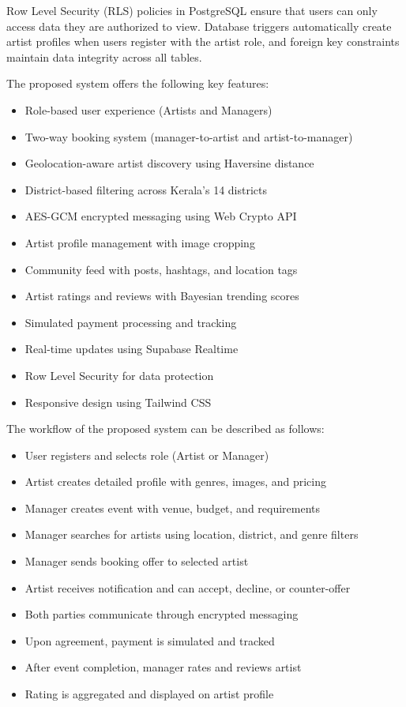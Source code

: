 \documentclass[12pt,a4paper]{report}
\begin{document}
Row Level Security (RLS) policies in PostgreSQL ensure that users can only access data they are authorized to view. Database triggers automatically create artist profiles when users register with the artist role, and foreign key constraints maintain data integrity across all tables.

The proposed system offers the following key features:
\begin{itemize}
\item Role-based user experience (Artists and Managers)
\item Two-way booking system (manager-to-artist and artist-to-manager)
\item Geolocation-aware artist discovery using Haversine distance
\item District-based filtering across Kerala's 14 districts
\item AES-GCM encrypted messaging using Web Crypto API
\item Artist profile management with image cropping
\item Community feed with posts, hashtags, and location tags
\item Artist ratings and reviews with Bayesian trending scores
\item Simulated payment processing and tracking
\item Real-time updates using Supabase Realtime
\item Row Level Security for data protection
\item Responsive design using Tailwind CSS
\end{itemize}

The workflow of the proposed system can be described as follows:
\begin{itemize}
\item User registers and selects role (Artist or Manager)
\item Artist creates detailed profile with genres, images, and pricing
\item Manager creates event with venue, budget, and requirements
\item Manager searches for artists using location, district, and genre filters
\item Manager sends booking offer to selected artist
\item Artist receives notification and can accept, decline, or counter-offer
\item Both parties communicate through encrypted messaging
\item Upon agreement, payment is simulated and tracked
\item After event completion, manager rates and reviews artist
\item Rating is aggregated and displayed on artist profile
\end{itemize}
\end{document}
